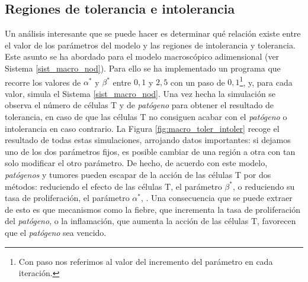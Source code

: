 


\subsection{Regiones de tolerancia e intolerancia}
\label{sub:reg_tolerIntolerMacro}

Un análisis interesante que se puede hacer es determinar qué relación existe entre el valor de los parámetros del modelo y las regiones de intolerancia y tolerancia. Este asunto se ha abordado para el modelo macroscópico adimensional (ver Sistema \ref{sist_macro_nod}). Para ello se ha implementado un programa que recorre los valores de $\alpha^{*}$ y $\beta^{*}$ entre $0,1$ y $2,5$ con un paso de $0,1$\footnote{Con paso nos referimos al valor del incremento del parámetro en cada iteración.}, y, para cada valor, simula el Sistema \ref{sist_macro_nod}. Una vez hecha la simulación se observa el número de células T y de \textit{patógeno} para obtener el resultado de tolerancia, en caso de que las células T no consiguen acabar con el \textit{patógeno} o intolerancia en caso contrario. La Figura \ref{fig:macro_toler_intoler} recoge el resultado de todas estas simulaciones, arrojando datos importantes: si dejamos uno de los dos parámetros fijos, es posible cambiar de una región a otra con tan solo modificar el otro parámetro. De hecho, de acuerdo con este modelo, \textit{patógenos} y tumores pueden escapar de la acción de las células T por dos métodos: reduciendo el efecto de las células T, el parámetro $\beta^{*}$, o reduciendo su tasa de proliferación, el parámetro $\alpha^{*}$, \citep{arias2016emergent}. Una consecuencia que se puede extraer de esto es que mecanismos como la fiebre, que incrementa la tasa de proliferación del \textit{patógeno}, o la inflamación, que aumenta la acción de las células T, favorecen que el \textit{patógeno} sea vencido. 

